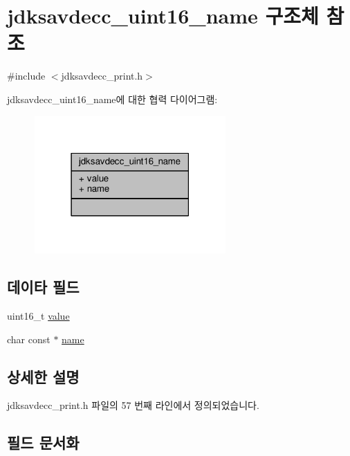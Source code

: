 \hypertarget{structjdksavdecc__uint16__name}{}\section{jdksavdecc\+\_\+uint16\+\_\+name 구조체 참조}
\label{structjdksavdecc__uint16__name}


{\ttfamily \#include $<$jdksavdecc\+\_\+print.\+h$>$}



jdksavdecc\+\_\+uint16\+\_\+name에 대한 협력 다이어그램\+:
\nopagebreak
\begin{figure}[H]
\begin{center}
\leavevmode
\includegraphics[width=207pt]{structjdksavdecc__uint16__name__coll__graph}
\end{center}
\end{figure}
\subsection*{데이타 필드}
\begin{DoxyCompactItemize}
\item 
uint16\+\_\+t \hyperlink{structjdksavdecc__uint16__name_a900b69af7d674b8db3bceae754b4955a}{value}
\item 
char const $\ast$ \hyperlink{structjdksavdecc__uint16__name_a5f1de76dd5d451949e12c0fbc966ca70}{name}
\end{DoxyCompactItemize}


\subsection{상세한 설명}


jdksavdecc\+\_\+print.\+h 파일의 57 번째 라인에서 정의되었습니다.



\subsection{필드 문서화}
